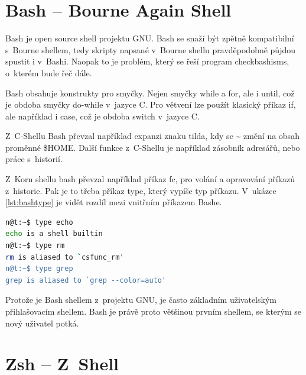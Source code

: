 \documentclass[thesis=M,czech]{FITthesis}[2012/06/26]
\begin{document}

%
%
%
\section{Bash -- Bourne Again Shell}

Bash \cite{bash} \cite{learningthebashshell} \cite{unixprogrammingenvironment} je open source shell projektu GNU. Bash se snaží být zpětně kompatibilní s~Bourne shellem, tedy skripty napsané v~Bourne shellu pravděpodobně půjdou spustit i v~Bashi. Naopak to je problém, který se řeší program checkbashisms, o~kterém bude řeč dále.

Bash obsahuje konstrukty pro smyčky. Nejen smyčky while a for, ale i until, což je obdoba smyčky do-while v~jazyce C. Pro větvení lze použít klasický příkaz if, ale například i case, což je obdoba switch v~jazyce C.

Z~C-Shellu Bash převzal například expanzi znaku tilda, kdy se \textasciitilde{} změní na obsah proměnné \$HOME. Další funkce z~C-Shellu je například zásobník adresářů, nebo práce s~historií.

Z~Korn shellu bash převzal například příkaz fc, pro volání a opravování příkazů z~historie. Pak je to třeba příkaz type, který vypíše typ příkazu. V~ukázce \ref{lst:bashtype} je vidět rozdíl mezi vnitřním příkazem Bashe.

\noindent
\begin{minipage}{\linewidth}
\begin{lstlisting}[language=bash, caption={Příkaz type v~Bashi}, label={lst:bashtype}]
n@t:~$ type echo
echo is a shell builtin
n@t:~$ type rm
rm is aliased to `csfunc_rm'
n@t:~$ type grep
grep is aliased to `grep --color=auto'
\end{lstlisting}
\end{minipage}

Protože je Bash shellem z~projektu GNU, je často základním uživatelským přihlašovacím shellem. Bash je právě proto většinou prvním shellem, se kterým se nový uživatel potká.




%
%
%
\section{Zsh -- Z~Shell}
\end{document}

